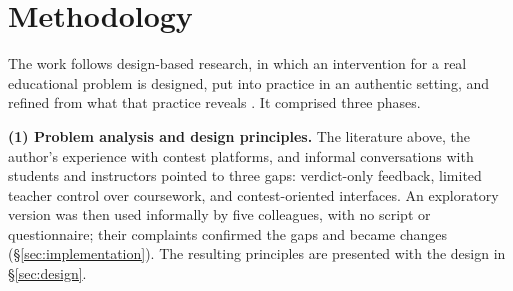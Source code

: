 \documentclass[12pt]{article}
\begin{document}
\begin{table}[ht]
\centering
\scriptsize
\setlength{\tabcolsep}{3pt}
\caption{Comparison of WhyRunner with related tools, as described in the cited sources. n/r: not reported in those sources; ---: not applicable.}
\label{tab:judge-comparison}
\end{table}

\section{Methodology}\label{sec:methodology}

The work follows design-based research, in which an intervention for a real educational problem is designed, put into practice in an authentic setting, and refined from what that practice reveals \cite{wang2005dbr}. It comprised three phases.

\textbf{(1) Problem analysis and design principles.} The literature above, the author's experience with contest platforms, and informal conversations with students and instructors pointed to three gaps: verdict-only feedback, limited teacher control over coursework, and contest-oriented interfaces. An exploratory version was then used informally by five colleagues, with no script or questionnaire; their complaints confirmed the gaps and became changes (\S\ref{sec:implementation}). The resulting principles are presented with the design in \S\ref{sec:design}.
\end{document}
